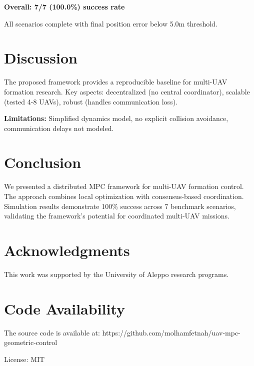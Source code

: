 \documentclass[10pt,article]{article}
\begin{document}
\textbf{Overall: 7/7 (100.0\%) success rate}

All scenarios complete with final position error below 5.0m threshold.

\section{Discussion}

The proposed framework provides a reproducible baseline for multi-UAV formation research. Key aspects: decentralized (no central coordinator), scalable (tested 4-8 UAVs), robust (handles communication loss).

\textbf{Limitations:} Simplified dynamics model, no explicit collision avoidance, communication delays not modeled.

\section{Conclusion}

We presented a distributed MPC framework for multi-UAV formation control. The approach combines local optimization with consensus-based coordination. Simulation results demonstrate 100\% success across 7 benchmark scenarios, validating the framework's potential for coordinated multi-UAV missions.

\section{Acknowledgments}

This work was supported by the University of Aleppo research programs.




\section{Code Availability}

The source code is available at: https://github.com/molhamfetnah/uav-mpc-geometric-control

License: MIT
\end{document}
